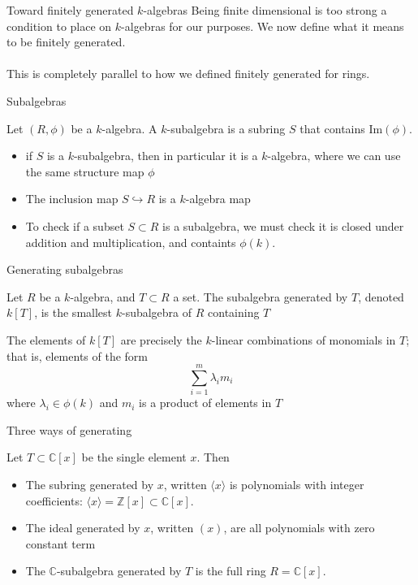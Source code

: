 \documentclass{beamer}
\newcommand{\C}{\mathbb{C}}
\newcommand{\Z}{\mathbb{Z}}
\begin{document}
\begin{frame}{Toward finitely generated $k$-algebras}
Being finite dimensional is too strong a condition to place on $k$-algebras for our purposes.  We now define what it means to be finitely generated.  \\~\\

This is completely parallel to how we defined finitely generated for rings.


\end{frame}

\begin{frame}{Subalgebras}
\begin{definition} Let $(R,\phi)$ be a $k$-algebra.  A $k$-subalgebra is a subring $S$ that contains $\textrm{Im}(\phi)$.  
\end{definition}

\begin{itemize}
\item if $S$ is a $k$-subalgebra, then in particular it is a $k$-algebra, where we can use the same structure map $\phi$
\item The inclusion map $S\hookrightarrow R$ is a $k$-algebra map
\item To check if a subset $S\subset R$ is a subalgebra, we must check it is closed under addition and multiplication, and containts $\phi(k)$.
\end{itemize}


\end{frame}


\begin{frame}{Generating subalgebras}

\begin{definition} Let $R$ be a $k$-algebra, and $T\subset R$ a set.  The subalgebra generated by $T$, denoted $k[T]$, is the smallest $k$-subalgebra of $R$ containing $T$
\end{definition}

\begin{lemma} The elements of $k[T]$ are precisely the $k$-linear combinations of monomials in $T$; that is, elements of the form
$$\sum_{i=1}^m \lambda_i m_i$$
where $\lambda_i\in \phi(k)$ and $m_i$ is a product of elements in $T$
\end{lemma}
\end{frame}

\begin{frame}{Three ways of generating}

Let $T\subset \C[x]$ be the single element $x$.  Then
\begin{itemize}
\item The subring generated by $x$, written $\langle x\rangle$ is polynomials with integer coefficients: $\langle x\rangle=\Z[x]\subset \C[x]$.
\item The ideal generated by $x$, written $(x)$, are all polynomials with zero constant term
\item The $\C$-subalgebra generated by $T$ is the full ring $R=\C[x]$.
\end{itemize}
\end{frame}
\end{document}
